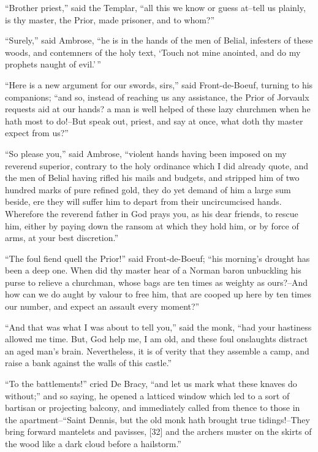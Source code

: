 ``Brother priest,'' said the Templar, ``all this we know or guess
at--tell us plainly, is thy master, the Prior, made prisoner, and to
whom?''

``Surely,'' said Ambrose, ``he is in the hands of the men of Belial,
infesters of these woods, and contemners of the holy text, `Touch not
mine anointed, and do my prophets naught of evil.'\,''

``Here is a new argument for our swords, sirs,'' said Front-de-Boeuf,
turning to his companions; ``and so, instead of reaching us any
assistance, the Prior of Jorvaulx requests aid at our hands? a man is
well helped of these lazy churchmen when he hath most to do!--But speak
out, priest, and say at once, what doth thy master expect from us?''

``So please you,'' said Ambrose, ``violent hands having been imposed on
my reverend superior, contrary to the holy ordinance which I did already
quote, and the men of Belial having rifled his mails and budgets, and
stripped him of two hundred marks of pure refined gold, they do yet
demand of him a large sum beside, ere they will suffer him to depart
from their uncircumcised hands. Wherefore the reverend father in God
prays you, as his dear friends, to rescue him, either by paying down the
ransom at which they hold him, or by force of arms, at your best
discretion.''

``The foul fiend quell the Prior!'' said Front-de-Boeuf; ``his morning's
drought has been a deep one. When did thy master hear of a Norman baron
unbuckling his purse to relieve a churchman, whose bags are ten times as
weighty as ours?--And how can we do aught by valour to free him, that
are cooped up here by ten times our number, and expect an assault every
moment?''

``And that was what I was about to tell you,'' said the monk, ``had your
hastiness allowed me time. But, God help me, I am old, and these foul
onslaughts distract an aged man's brain. Nevertheless, it is of verity
that they assemble a camp, and raise a bank against the walls of this
castle.''

``To the battlements!'' cried De Bracy, ``and let us mark what these
knaves do without;'' and so saying, he opened a latticed window which
led to a sort of bartisan or projecting balcony, and immediately called
from thence to those in the apartment--``Saint Dennis, but the old monk
hath brought true tidings!--They bring forward mantelets and pavisses,
{[}32{]} and the archers muster on the skirts of the wood like a dark
cloud before a hailstorm.''

